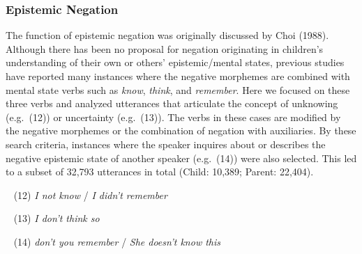 \documentclass[10pt, letterpaper]{article}
\begin{document}
\hypertarget{epistemic-negation}{%
\subsubsection{Epistemic Negation}\label{epistemic-negation}}

The function of epistemic negation was originally discussed by Choi
(1988). Although there has been no proposal for negation originating in
children's understanding of their own or others' epistemic/mental
states, previous studies have reported many instances where the negative
morphemes are combined with mental state verbs such as \emph{know},
\emph{think}, and \emph{remember}. Here we focused on these three verbs
and analyzed utterances that articulate the concept of unknowing
(e.g.~(12)) or uncertainty (e.g.~(13)). The verbs in these cases are
modified by the negative morphemes or the combination of negation with
auxiliaries. By these search criteria, instances where the speaker
inquires about or describes the negative epistemic state of another
speaker (e.g.~(14)) were also selected. This led to a subset of 32,793
utterances in total (Child: 10,389; Parent: 22,404).

~ (12) \emph{I not know} / \emph{I didn't remember}

~ (13) \emph{I don't think so}

~ (14) \emph{don't you remember} / \emph{She doesn't know this}
\end{document}
